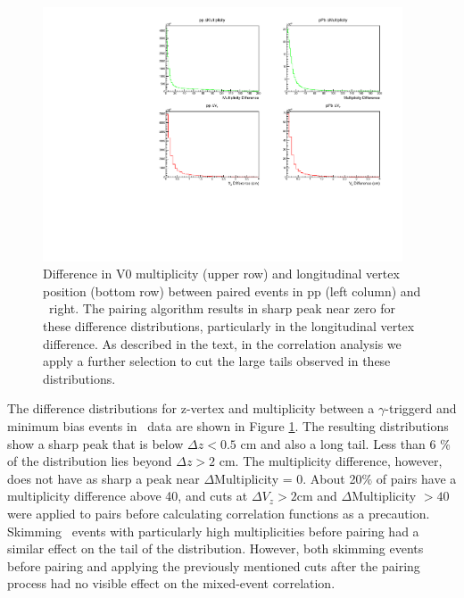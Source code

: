 \begin{figure}[h]
  \center
  \includegraphics[width=0.95\textwidth]{Data_Analysis/EventMixing/pPb_Differences.pdf}
  \caption{Difference in V0 multiplicity
  (upper row) and longitudinal vertex position (bottom row) between paired events in pp (left column) and \pPb~right. The pairing algorithm results in sharp peak near zero for these difference distributions, particularly in the longitudinal vertex difference. As described in the text, in the correlation analysis we apply a further selection to cut the large tails observed in these distributions. }
  \label{Difference_distributions}
\end{figure}

The difference distributions for z-vertex and multiplicity between a \(\gamma\)-triggerd and minimum bias events in \pPb~data are shown in Figure \ref{Difference_distributions}. The resulting distributions show a sharp peak that is below {$\Delta z<0.5$ cm} and also a long tail. Less than 6 \% of the distribution lies beyond $\Delta z > 2$ cm. The multiplicity difference, however, does not have as sharp a peak near \(\Delta\)Multiplicity = 0. About 20$\%$ of pairs have a multiplicity difference above 40, and cuts at \(\Delta V_z > 2\)cm and \(\Delta\)Multiplicity \(> 40\) were applied to pairs before calculating correlation functions as a precaution.
Skimming \pPb~events with particularly high multiplicities before pairing had a similar effect on the tail of the distribution. However, both skimming events before pairing and applying the previously mentioned cuts after the pairing process had no visible effect on the mixed-event correlation.


